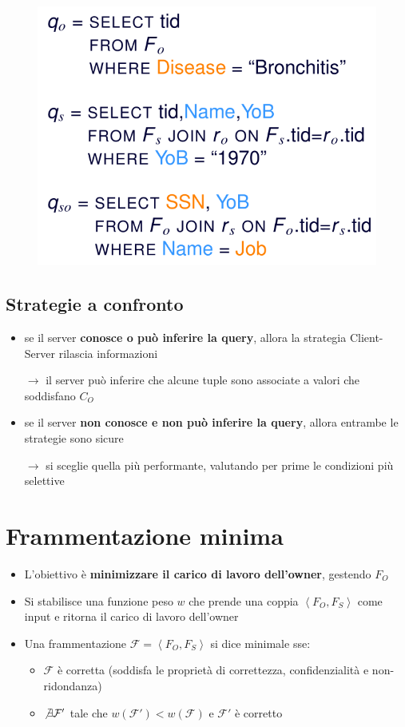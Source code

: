\documentclass{report}
\begin{document}
\begin{figure}[ht]
    \centering
    \includegraphics[width=0.6\linewidth]{images/fragmentation/cs.png}
\end{figure}

\subsection{Strategie a confronto}
\begin{itemize}
    \item se il server \textbf{conosce o può inferire la query}, allora la strategia Client-Server rilascia informazioni
    
    $\rightarrow$ il server può inferire che alcune tuple sono associate a valori che soddisfano $C_O$
    \item se il server \textbf{non conosce e non può inferire la query}, allora entrambe le strategie sono sicure 
    
    $\rightarrow$ si sceglie quella più performante, valutando per prime le condizioni più selettive
\end{itemize}

\newpage
\section{Frammentazione minima}
\begin{itemize}
    \item L'obiettivo è \textbf{minimizzare il carico di lavoro dell'owner}, gestendo $F_O$
    \item Si stabilisce una funzione peso $w$ che prende una coppia $\left\langle F_O, F_S \right\rangle$ come input
    e ritorna il carico di lavoro dell'owner 
    \item Una frammentazione $\mathcal{F} = \left\langle F_O, F_S \right\rangle$ si dice minimale sse:
    \begin{itemize}
        \item $\mathcal{F}$ è corretta (soddisfa le proprietà di correttezza, confidenzialità e non-ridondanza)
        \item $ \not\exists \mathcal{F}'$ tale che $w(\mathcal{F}') < w(\mathcal{F})$ e $\mathcal{F}'$ è corretto 
    \end{itemize}
\end{itemize}
\end{document}
